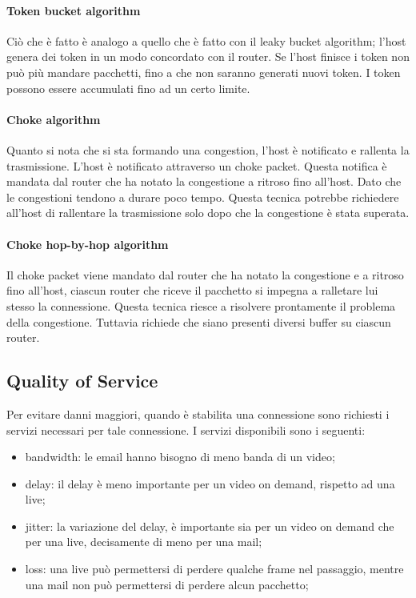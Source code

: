 \documentclass{article}
\begin{document}
\paragraph{Token bucket algorithm}
Ciò che è fatto è analogo a quello che è fatto con il leaky bucket algorithm;
l'host genera dei token in un modo concordato con il router. Se l'host finisce i
token non può più mandare pacchetti, fino a che non saranno generati nuovi
token. I token possono essere accumulati fino ad un certo limite.\\

\paragraph{Choke algorithm}
Quanto si nota che si sta formando una congestion, l'host è notificato e
rallenta la trasmissione. L'host è notificato attraverso un choke packet.
Questa notifica è mandata dal router che ha notato la congestione a ritroso
fino all'host. Dato che le congestioni tendono a durare poco tempo. Questa
tecnica potrebbe richiedere all'host di rallentare la trasmissione solo dopo che
la congestione è stata superata.\\

\paragraph{Choke hop-by-hop algorithm}
Il choke packet viene mandato dal router che ha notato la congestione e a
ritroso fino all'host, ciascun router che riceve il pacchetto si impegna a
ralletare lui stesso la connessione. Questa tecnica riesce a risolvere
prontamente il problema della congestione. Tuttavia richiede che siano presenti
diversi buffer su ciascun router.\\

\subsection{Quality of Service}
Per evitare danni maggiori, quando è stabilita una connessione sono richiesti i
servizi necessari per tale connessione. I servizi disponibili sono i seguenti:
\begin{itemize}
	\item bandwidth: le email hanno bisogno di meno banda di un video;

	\item delay: il delay è meno importante per un video on demand, rispetto ad
		una live;

	\item jitter: la variazione del delay, è importante sia per un video on
		demand che per una live, decisamente di meno per una mail;

	\item loss: una live può permettersi di perdere qualche frame nel passaggio, 
		mentre una mail non può permettersi di perdere alcun pacchetto;
\end{itemize}
\end{document}

